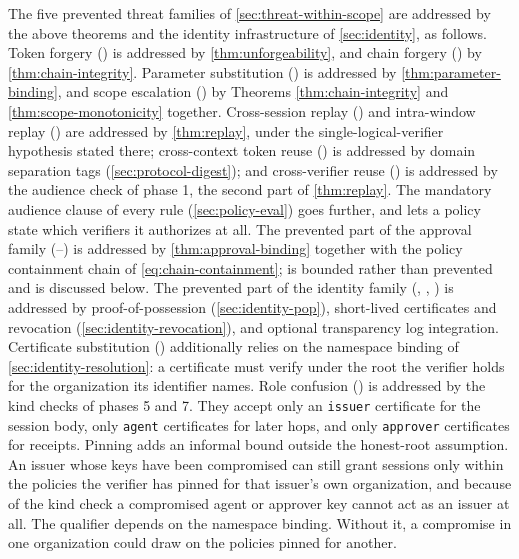 \documentclass[11pt,a4paper]{article}
\begin{document}
The five prevented threat families of \cref{sec:threat-within-scope} are
addressed by the above theorems and the identity infrastructure of
\cref{sec:identity}, as follows. Token forgery () is
addressed by \cref{thm:unforgeability}, and chain forgery
() by \cref{thm:chain-integrity}. Parameter substitution
() is addressed by \cref{thm:parameter-binding}, and scope
escalation () by Theorems \ref{thm:chain-integrity} and
\ref{thm:scope-monotonicity} together. Cross-session replay
() and intra-window replay () are addressed
by \cref{thm:replay}, under the single-logical-verifier hypothesis
stated there; cross-context token reuse () is addressed by
domain separation tags (\cref{sec:protocol-digest}); and cross-verifier
reuse () is addressed by the audience check of phase 1,
the second part of \cref{thm:replay}. The mandatory audience clause of
every rule (\cref{sec:policy-eval}) goes further, and lets a policy
state which verifiers it authorizes at all. The prevented part
of the approval family (--) is addressed by
\cref{thm:approval-binding} together with the policy containment chain
of \cref{eq:chain-containment};  is bounded rather than
prevented and is discussed below. The prevented part of the identity
family (, , ) is addressed by
proof-of-possession
(\cref{sec:identity-pop}), short-lived certificates and revocation
(\cref{sec:identity-revocation}), and optional transparency log
integration. Certificate substitution () additionally
relies on the namespace binding of \cref{sec:identity-resolution}: a
certificate must verify under the root the verifier holds for the
organization its identifier names. Role confusion () is
addressed by the kind checks of phases 5 and 7. They accept only an
\texttt{issuer} certificate for the session body, only \texttt{agent}
certificates for later hops, and only \texttt{approver} certificates for
receipts. Pinning adds an informal bound outside the honest-root
assumption. An issuer whose keys have been compromised can still grant
sessions only within the policies the verifier has pinned for that
issuer's own organization, and because of the kind check a compromised
agent or approver key cannot act as an issuer at all. The qualifier
depends on the namespace binding. Without it, a compromise in one
organization could draw on the policies pinned for another.
\end{document}

